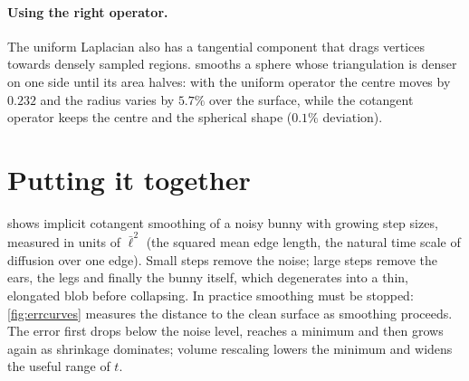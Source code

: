 \paragraph{Using the right operator.} The uniform Laplacian also has a tangential component that
drags vertices towards densely sampled regions.  smooths a sphere whose
triangulation is denser on one side until its area halves: with the uniform operator
the centre moves by $0.232$ and the radius varies by $5.7\%$ over the surface, while the cotangent
operator keeps the centre and the spherical shape ($0.1\%$ deviation).


\section{Putting it together}

 shows implicit cotangent smoothing of a noisy bunny with growing step sizes,
measured in units of $\bar\ell^2$ (the squared mean edge length, the natural time scale of
diffusion over one edge). Small steps remove the noise; large steps remove the ears, the legs and
finally the bunny itself, which degenerates into a thin, elongated blob before collapsing. In
practice smoothing must be stopped: \cref{fig:errcurves} measures the distance to the clean
surface as smoothing proceeds. The error first drops below the noise level, reaches a minimum and
then grows again as shrinkage dominates; volume rescaling lowers the minimum and widens the
useful range of $t$.



